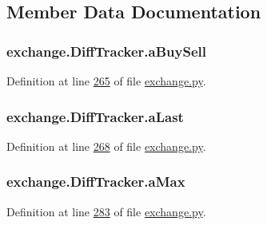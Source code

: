 \subsection{Member Data Documentation}
\subsubsection[{\texorpdfstring{a\+Buy\+Sell}{aBuySell}}]{\setlength{\rightskip}{0pt plus 5cm}exchange.\+Diff\+Tracker.\+a\+Buy\+Sell}\hypertarget{classexchange_1_1_diff_tracker_ae6108d1ec0cdf3b195ed5bb7c8b529b2}{}\label{classexchange_1_1_diff_tracker_ae6108d1ec0cdf3b195ed5bb7c8b529b2}


Definition at line \hyperlink{exchange_8py_source_l00265}{265} of file \hyperlink{exchange_8py_source}{exchange.\+py}.

\subsubsection[{\texorpdfstring{a\+Last}{aLast}}]{\setlength{\rightskip}{0pt plus 5cm}exchange.\+Diff\+Tracker.\+a\+Last}\hypertarget{classexchange_1_1_diff_tracker_ae428ab91ae6471c4ad8b566540fb035e}{}\label{classexchange_1_1_diff_tracker_ae428ab91ae6471c4ad8b566540fb035e}


Definition at line \hyperlink{exchange_8py_source_l00268}{268} of file \hyperlink{exchange_8py_source}{exchange.\+py}.

\subsubsection[{\texorpdfstring{a\+Max}{aMax}}]{\setlength{\rightskip}{0pt plus 5cm}exchange.\+Diff\+Tracker.\+a\+Max}\hypertarget{classexchange_1_1_diff_tracker_a3dcbc689ebb5ec6e0c8e600079d95de9}{}\label{classexchange_1_1_diff_tracker_a3dcbc689ebb5ec6e0c8e600079d95de9}


Definition at line \hyperlink{exchange_8py_source_l00283}{283} of file \hyperlink{exchange_8py_source}{exchange.\+py}.

